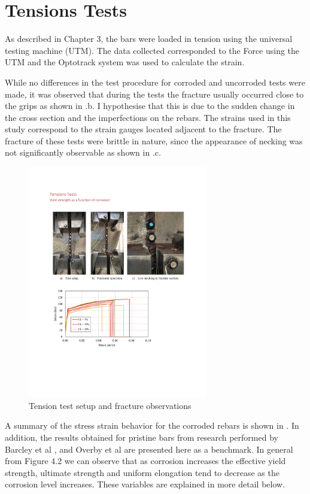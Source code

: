 \newpage
\section{Tensions Tests}

As described in Chapter 3, the bars were loaded in tension using the universal testing machine (UTM). The data collected corresponded to the Force using the UTM and the Optotrack system was used to calculate the strain.

While no differences in the test procedure for corroded and uncorroded tests were made, it was observed that during the tests the fracture usually occurred close to the grips as shown in 
.b. I hypothesise that this is due to the sudden change in the cross section and the imperfections on the rebars. The strains used in this study correspond to the strain gauges located adjacent to the fracture. The fracture of these tests were brittle in nature, since the appearance of necking was not significantly observable as shown in .c.

\begin{figure}[htbp]
	\centering
	\includegraphics[width=0.7\textwidth]{VAC Thesis 2.0/Chapter-4/figs/TensionTest_images.pdf}
	\caption{Tension test setup and fracture observations}
	\label{fig:TensionTest_NoNecking}
\end{figure}

A summary of the stress strain behavior for the corroded rebars is shown in . In addition, the results obtained for pristine bars from research performed by Barcley et al \cite{Barcley2018}, and Overby et al \cite{Overby2016} are presented here as a benchmark. In general from Figure 4.2 we can observe that as corrosion increases the effective yield strength, ultimate strength and uniform elongation tend to decrease as the corrosion level increases.  These variables are explained in more detail below.

